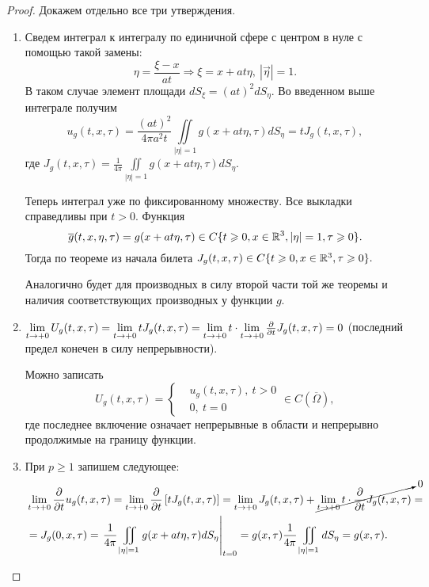 \begin{proof} Докажем отдельно все три утверждения.
\begin{enumerate}
\item Сведем интеграл к интегралу по единичной сфере с центром в нуле с помощью такой замены:
\[
\eta = \frac{\xi - x}{at}\Rightarrow \xi = x+at\eta ,\ |\vec{\eta} |=1.
\]
В таком случае элемент площади $dS_{\xi}=(at)^2dS_{\eta}$. Во введенном выше интеграле получим 
\[
u_g(t,x,\tau)=\frac{(at)^2}{4\pi a^2t}\iint\limits_{|\eta |=1}g(x+at\eta ,\tau ) dS_{\eta}=tJ_g(t,x,\tau ),
\]
где $J_g(t,x,\tau )= \frac{1}{4\pi}\iint\limits_{|\eta |=1}g(x+at\eta ,\tau ) dS_{\eta}$.

Теперь интеграл уже по фиксированному множеству. Все выкладки справедливы при $t>0$. Функция
\[
\overline{g}(t,x,\eta ,\tau)=g(x+at\eta, \tau)\in C\{t\geqslant 0, x\in \mathbb{R}^3 , |\eta | = 1, \tau\geqslant 0\}.
\]
Тогда по теореме из начала билета $J_g(t,x,\tau )\in C\{t\geqslant 0, x\in \mathbb{R}^3,\tau\geqslant 0\}.$

Аналогично будет для производных в силу второй части той же теоремы и наличия соответствующих производных у функции $g$.

\item $\lim\limits_{t\rightarrow +0}U_g(t,x,\tau )=\lim\limits_{t\rightarrow +0}tJ_g(t,x,\tau )=\lim\limits_{t\rightarrow +0}t\cdot\lim\limits_{t\rightarrow +0}\frac{\partial }{\partial t}J_g(t,x,\tau ) = 0$ (последний предел конечен в силу непрерывности).

Можно записать
\[
U_g(t,x,\tau ) = \begin{cases}
&u_g(t,x, \tau ),\ t>0\\
&0,\ t=0
\end{cases} \in C\left(\overline{\Omega} \right),
\]
где последнее включение означает непрерывные в области и непрерывно продолжимые на границу функции.

\item При $p\geq 1$ запишем следующее:
\begin{equation*}
\begin{split}
&\lim\limits_{t\rightarrow +0}\frac{\partial}{\partial t} u_g(t,x, \tau) = \lim\limits_{t\rightarrow +0}\frac{\partial}{\partial t}\left[tJ_g(t,x,\tau )\right]=\lim\limits_{t\rightarrow +0}J_g(t,x,\tau )+\cancelto{0}{\lim\limits_{t\rightarrow +0}t\cdot \frac{\partial}{\partial t}J_g(t,x,\tau )}=\\
&=J_g(0, x, \tau )=\left.\frac{1}{4\pi}\iint\limits_{|\eta |=1}g(x+at\eta ,\tau )dS_{\eta }\right|_{t=0}=g(x, \tau )\frac{1}{4\pi}\iint\limits_{|\eta |=1}dS_{\eta}=g(x,\tau ).
\end{split}
\end{equation*}
\end{enumerate}
\end{proof}

